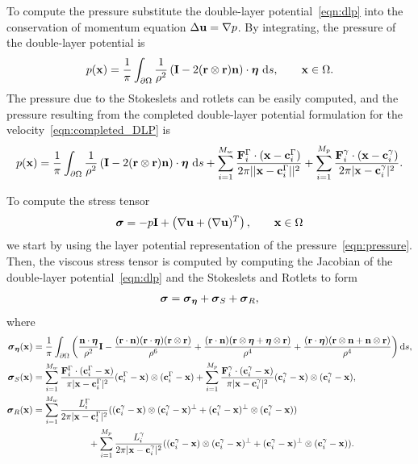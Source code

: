 \documentclass[preprint, 10pt]{elsarticle}
\begin{document}
To compute the pressure substitute the double-layer potential~\eqref{eqn:dlp} into the conservation of momentum equation $\Delta{\mathbf{u}} = \nabla p$.  By
integrating, the pressure of the double-layer potential is
\begin{align*}
  p({\mathbf{x}}) = \frac{1}{\pi}\int_{\partial\Omega}\frac{1}{\rho^2}\left(
    \mathbf{I} - 2({\mathbf{r}} \otimes {\mathbf{r}}){\mathbf{n}}\right)\cdot{\boldsymbol\eta}~\text{d}s, \qquad{\mathbf{x}}\in\Omega.
\end{align*}
The pressure due to the Stokeslets and rotlets can be easily computed,
and the pressure resulting from the completed double-layer potential
formulation for the velocity~\eqref{eqn:completed_DLP} is
\begin{align}
  \label{eqn:pressure} 
  p({\mathbf{x}}) = \frac{1}{\pi}\int_{\partial\Omega}\frac{1}{\rho^2}\left(
    \mathbf{I} - 2({\mathbf{r}} \otimes {\mathbf{r}}){\mathbf{n}}\right)\cdot{\boldsymbol\eta}~\text{d}s +
  \sum_{i=1}^{M_w}
  \frac{{\mathbf{F}}_i^\Gamma\cdot({\mathbf{x}}-{\mathbf{c}}_i^\Gamma)}{2\pi||{\mathbf{x}}-{\mathbf{c}}_i^{\Gamma}||^2}
  + \sum_{i=1}^{M_p}
    \frac{{\mathbf{F}}_i^\gamma\cdot({\mathbf{x}}-{\mathbf{c}}_i^\gamma)}{2\pi|{\mathbf{x}}-{\mathbf{c}}_i^\gamma|^2}.
\end{align}

To compute the stress tensor
\begin{align*} 
  {\boldsymbol\sigma} = -p \mathbf{I} + \left(\nabla {\mathbf{u}} + (\nabla{\mathbf{u}})^T\right), \qquad {\mathbf{x}}\in\Omega
\end{align*}
we start by using the layer potential representation of the
pressure~\eqref{eqn:pressure}.  Then, the viscous stress tensor is
computed by computing the Jacobian of the double-layer
potential~\eqref{eqn:dlp} and the Stokeslets and Rotlets to form
\begin{align}
  \label{eqn:stress}
  {\boldsymbol\sigma} = {\boldsymbol\sigma}_{{\boldsymbol\eta}} + {\boldsymbol\sigma}_{S} + {\boldsymbol\sigma}_{R},
\end{align}
where
\begin{align*}
  {\boldsymbol\sigma}_{{\boldsymbol\eta}}({\mathbf{x}}) &= \frac{1}{\pi}\int_{\partial\Omega}\left( 
    \frac{{\mathbf{n}}\cdot{\boldsymbol\eta}}{\rho^2}\mathbf{I} 
    -\frac{({\mathbf{r}}\cdot{\mathbf{n}})({\mathbf{r}}\cdot{\boldsymbol\eta})({\mathbf{r}}\otimes{\mathbf{r}})}{\rho^6} 
    +\frac{({\mathbf{r}}\cdot{\mathbf{n}})({\mathbf{r}}\otimes{\boldsymbol\eta} + {\boldsymbol\eta}\otimes{\mathbf{r}})}{\rho^4} 
    + \frac{({\mathbf{r}}\cdot{\boldsymbol\eta})({\mathbf{r}}\otimes{\mathbf{n}} + {\mathbf{n}}\otimes{\mathbf{r}})}{\rho^4}\right)\text{d}s,\\
  {\boldsymbol\sigma}_S({\mathbf{x}}) &= \sum_{i=1}^{M_w} 
    \frac{{\mathbf{F}}_i^\Gamma\cdot({\mathbf{c}}_i^\Gamma-{\mathbf{x}})}{\pi|{\mathbf{x}}-{\mathbf{c}}_i^\Gamma|^2}
        ({\mathbf{c}}_i^\Gamma - {\mathbf{x}})\otimes({\mathbf{c}}_i^\Gamma-{\mathbf{x}})  + 
    \sum_{i=1}^{M_p}
    \frac{{\mathbf{F}}_i^\gamma\cdot({\mathbf{c}}_i^\gamma-{\mathbf{x}})}{\pi|{\mathbf{x}}-{\mathbf{c}}_i^\gamma|^2}
        ({\mathbf{c}}_i^\gamma - {\mathbf{x}})\otimes({\mathbf{c}}_i^\gamma-{\mathbf{x}}),\\
  {\boldsymbol\sigma}_R({\mathbf{x}}) &= \sum_{i=1}^{M_w} \frac{L_i^\Gamma}{2\pi|{\mathbf{x}}-{\mathbf{c}}_i^\Gamma|^2}
        (({\mathbf{c}}_i^\gamma - {\mathbf{x}})\otimes({\mathbf{c}}_i^\gamma-{\mathbf{x}})^\perp + 
    ({\mathbf{c}}_i^\gamma - {\mathbf{x}})^\perp\otimes({\mathbf{c}}_i^\gamma-{\mathbf{x}}))  \\
  &\qquad\qquad\qquad + \sum_{i=1}^{M_p} \frac{L_i^\gamma}{2\pi|{\mathbf{x}}-{\mathbf{c}}_i^\gamma|^2}
    (({\mathbf{c}}_i^\gamma - {\mathbf{x}})\otimes({\mathbf{c}}_i^\gamma-{\mathbf{x}})^\perp + 
    ({\mathbf{c}}_i^\gamma - {\mathbf{x}})^\perp\otimes({\mathbf{c}}_i^\gamma-{\mathbf{x}})).
\end{align*}
\end{document}
